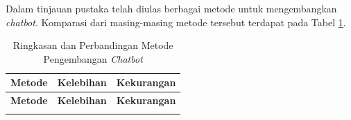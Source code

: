 Dalam tinjauan pustaka telah diulas berbagai metode untuk mengembangkan \textit{chatbot}.
Komparasi dari masing-masing metode tersebut terdapat pada Tabel \ref{tab:method-comparision}.

\begin{longtable}{|p{4cm}|p{5cm}|p{5cm}|}
	\caption{Ringkasan dan Perbandingan Metode Pengembangan \textit{Chatbot}} \label{tab:method-comparision} \\
	\hline
	\textbf{Metode} & \textbf{Kelebihan} & \textbf{Kekurangan}                                               \\
	\hline
	\endfirsthead

	\hline
	\textbf{Metode} & \textbf{Kelebihan} & \textbf{Kekurangan}                                               \\
	\hline
	\endhead

	\hline
	\endfoot


\end{longtable}
